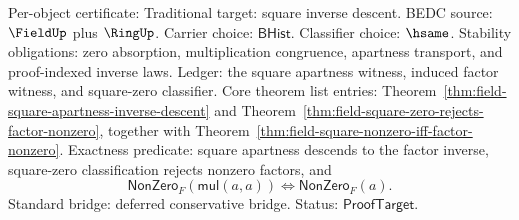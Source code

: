 Per-object certificate: Traditional target: square inverse descent. BEDC
source: $\FieldUp$ plus $\RingUp$. Carrier choice: $\mathsf{BHist}$.
Classifier choice: $\hsame$. Stability obligations: zero absorption,
multiplication congruence, apartness transport, and proof-indexed inverse
laws. Ledger: the square apartness witness, induced factor witness, and
square-zero classifier. Core theorem list entries:
Theorem~\ref{thm:field-square-apartness-inverse-descent} and
Theorem~\ref{thm:field-square-zero-rejects-factor-nonzero}, together with
Theorem~\ref{thm:field-square-nonzero-iff-factor-nonzero}. Exactness
predicate: square apartness descends to the factor inverse, square-zero
classification rejects nonzero factors, and
$$
\mathsf{NonZero}_F(\mathsf{mul}(a,a))
\Longleftrightarrow
\mathsf{NonZero}_F(a).
$$
Standard bridge: deferred conservative bridge. Status: $\mathsf{ProofTarget}$.
